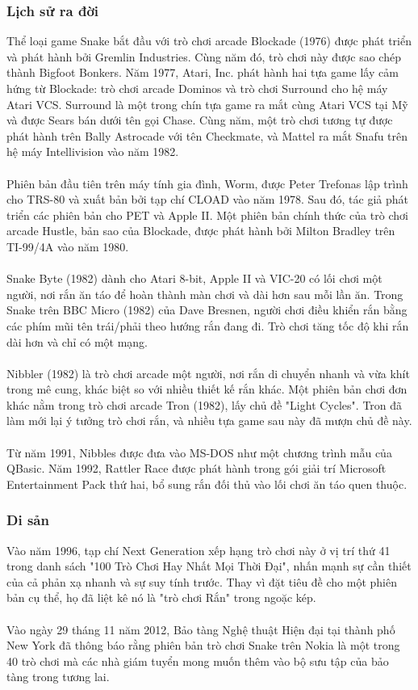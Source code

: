 \documentclass[a4paper, 12pt]{article}
\begin{document}
\subsubsection{Lịch sử ra đời}
Thể loại game Snake bắt đầu với trò chơi arcade Blockade (1976) được phát triển và phát hành bởi Gremlin Industries. Cùng năm đó, trò chơi này được sao chép thành Bigfoot Bonkers. Năm 1977, Atari, Inc. phát hành hai tựa game lấy cảm hứng từ Blockade: trò chơi arcade Dominos và trò chơi Surround cho hệ máy Atari VCS. Surround là một trong chín tựa game ra mắt cùng Atari VCS tại Mỹ và được Sears bán dưới tên gọi Chase. Cùng năm, một trò chơi tương tự được phát hành trên Bally Astrocade với tên Checkmate, và Mattel ra mắt Snafu trên hệ máy Intellivision vào năm 1982.
\\\\
Phiên bản đầu tiên trên máy tính gia đình, Worm, được Peter Trefonas lập trình cho TRS-80 và xuất bản bởi tạp chí CLOAD vào năm 1978. Sau đó, tác giả phát triển các phiên bản cho PET và Apple II. Một phiên bản chính thức của trò chơi arcade Hustle, bản sao của Blockade, được phát hành bởi Milton Bradley trên TI-99/4A vào năm 1980.
\\\\
Snake Byte (1982) dành cho Atari 8-bit, Apple II và VIC-20 có lối chơi một người, nơi rắn ăn táo để hoàn thành màn chơi và dài hơn sau mỗi lần ăn. Trong Snake trên BBC Micro (1982) của Dave Bresnen, người chơi điều khiển rắn bằng các phím mũi tên trái/phải theo hướng rắn đang đi. Trò chơi tăng tốc độ khi rắn dài hơn và chỉ có một mạng.
\\\\
Nibbler (1982) là trò chơi arcade một người, nơi rắn di chuyển nhanh và vừa khít trong mê cung, khác biệt so với nhiều thiết kế rắn khác. Một phiên bản chơi đơn khác nằm trong trò chơi arcade Tron (1982), lấy chủ đề "Light Cycles". Tron đã làm mới lại ý tưởng trò chơi rắn, và nhiều tựa game sau này đã mượn chủ đề này.
\\\\
Từ năm 1991, Nibbles được đưa vào MS-DOS như một chương trình mẫu của QBasic. Năm 1992, Rattler Race được phát hành trong gói giải trí Microsoft Entertainment Pack thứ hai, bổ sung rắn đối thủ vào lối chơi ăn táo quen thuộc.

\subsubsection{Di sản}
Vào năm 1996, tạp chí Next Generation xếp hạng trò chơi này ở vị trí thứ 41 trong danh sách "100 Trò Chơi Hay Nhất Mọi Thời Đại", nhấn mạnh sự cần thiết của cả phản xạ nhanh và sự suy tính trước. Thay vì đặt tiêu đề cho một phiên bản cụ thể, họ đã liệt kê nó là "trò chơi Rắn" trong ngoặc kép.
\\\\
Vào ngày 29 tháng 11 năm 2012, Bảo tàng Nghệ thuật Hiện đại tại thành phố New York đã thông báo rằng phiên bản trò chơi Snake trên Nokia là một trong 40 trò chơi mà các nhà giám tuyển mong muốn thêm vào bộ sưu tập của bảo tàng trong tương lai.
\end{document}
